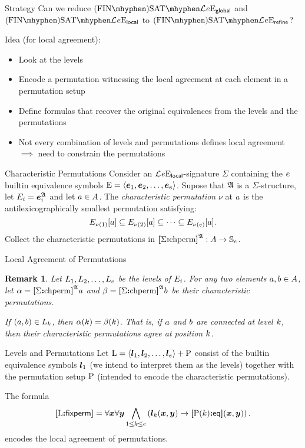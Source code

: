 \documentclass{beamer}
\newtheorem{remark}{Remark}
\begin{document}
\begin{frame}{Strategy}
Can we reduce $\FinASat{\Lvp\LL\nonv\nopow\Eea\sze\agglobal}$ and
$\FinASat{\Lvp\LL\nonv\nopow\Eea\sze\aglocal}$ to
$\FinASat{\Lvp\LL\nonv\nopow\Eea\sze\agrefine}$?
\pause

Idea (for local agreement):
\begin{itemize}
  \item Look at the levels
  \pause
  \item Encode a permutation witnessing the local agreement at each element in a
  permutation setup
  \pause
  \item Define formulas that recover the original equivalences from the
  levels and the permutations
  \pause
  \item Not every combination of levels and permutations defines
  local agreement $\implies$ need to constrain the permutations
\end{itemize}
\end{frame}

\begin{frame}{Characteristic Permutations}
Consider an $\mathcal{L}^{{}}_{{}}{e}\mathrm{E}_{\mathsf{local}}$-signature $\Sigma$ containing
the $e$ builtin equivalence symbols ${\mathrm{E}} = \left\langle \bm{e}_{1},\bm{e}_{2},\dots,\bm{e}_{e} \right\rangle$.
Supose that $\mathfrak{A}$ is a $\Sigma$-structure, let $E_{i} =
\bm{e}_{i}^{\mathfrak{A}}$ and let $a\in A$.
The \emph{characteristic permutation} $\nu$ at $a$ is the
antilexicographically smallest permutation satisfying:
\[
E_{\nu(1)}[a] \subseteq E_{\nu(2)}[a] \subseteq \dots
\subseteq E_{\nu(e)}[a].
\]
Collect the characteristic permutations in ${\bm{[}\Sigma\mathord{\bm{:}}\mathrm{chperm}\bm{]}}^{\mathfrak{A}} : A \to
\mathbb{S}_{e}$.
\end{frame}

\begin{frame}{Local Agreement of Permutations}
\begin{remark}
Let $L_{1},L_{2},\dots,L_{e}$ be the levels of $E_{i}$.
For any two elements $a,b\in A$, let $\alpha = {\bm{[}\Sigma\mathord{\bm{:}}\mathrm{chperm}\bm{]}}^{\mathfrak{A}}a$
and $\beta = {\bm{[}\Sigma\mathord{\bm{:}}\mathrm{chperm}\bm{]}}^{\mathfrak{A}}b$ be their characteristic permutations.

If $(a,b)\in L_{k}$, then $\alpha(k) = \beta(k)$.
That is, if $a$ and $b$ are connected at level $k$, then their
characteristic permutations agree at position $k$.
\end{remark}
\end{frame}

\begin{frame}{Levels and Permutations}
Let ${\mathrm{L}} = \left\langle \bm{l}_{1},\bm{l}_{2},\dots,\bm{l}_{e} \right\rangle + {\mathrm{P}}$ consist of the builtin
equivalence symbols $\bm{l}_{1}$ (we intend to interpret them as the levels)
together with the permutation setup ${\mathrm{P}}$ (intended to encode the
characteristic permutations).

The formula
\[
  {\bm{[}{\mathrm{L}}\mathord{\bm{:}}\mathsf{fixperm}\bm{]}} = \forall\bm{x} \forall\bm{y} \bigwedge_{1 \leq k \leq e}
  \left(\bm{l}_{k}(\bm{x},\bm{y}) \rightarrow {\bm{[}{\mathrm{P}}(k)\mathord{\bm{:}}\mathsf{eq}\bm{]}}(\bm{x},\bm{y})\right).
\]
encodes the local agreement of permutations.
\end{frame}
\end{document}
